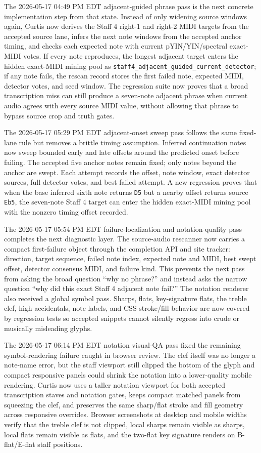 The 2026-05-17 04:49 PM EDT adjacent-guided phrase pass is the next concrete implementation step from that state. Instead of only widening source windows again, Curtis now derives the Staff 4 right-1 and right-2 MIDI targets from the accepted source lane, infers the next note windows from the accepted anchor timing, and checks each expected note with current pYIN/YIN/spectral exact-MIDI votes. If every note reproduces, the longest adjacent target enters the hidden exact-MIDI mining pool as \texttt{staff4\_adjacent\_guided\_current\_detector}; if any note fails, the rescan record stores the first failed note, expected MIDI, detector votes, and seed window. The regression suite now proves that a broad transcription miss can still produce a seven-note adjacent phrase when current audio agrees with every source MIDI value, without allowing that phrase to bypass source crop and truth gates.

The 2026-05-17 05:29 PM EDT adjacent-onset sweep pass follows the same fixed-lane rule but removes a brittle timing assumption. Inferred continuation notes now sweep bounded early and late offsets around the predicted onset before failing. The accepted five anchor notes remain fixed; only notes beyond the anchor are swept. Each attempt records the offset, note window, exact detector sources, full detector votes, and best failed attempt. A new regression proves that when the base inferred sixth note returns \texttt{D5} but a nearby offset returns source \texttt{Eb5}, the seven-note Staff 4 target can enter the hidden exact-MIDI mining pool with the nonzero timing offset recorded.

The 2026-05-17 05:54 PM EDT failure-localization and notation-quality pass completes the next diagnostic layer. The source-audio rescanner now carries a compact first-failure object through the completion API and site tracker: direction, target sequence, failed note index, expected note and MIDI, best swept offset, detector consensus MIDI, and failure kind. This prevents the next pass from asking the broad question ``why no phrase?'' and instead asks the narrow question ``why did this exact Staff 4 adjacent note fail?'' The notation renderer also received a global symbol pass. Sharps, flats, key-signature flats, the treble clef, high accidentals, note labels, and CSS stroke/fill behavior are now covered by regression tests so accepted snippets cannot silently regress into crude or musically misleading glyphs.

The 2026-05-17 06:14 PM EDT notation visual-QA pass fixed the remaining symbol-rendering failure caught in browser review. The clef itself was no longer a note-name error, but the staff viewport still clipped the bottom of the glyph and compact responsive panels could shrink the notation into a lower-quality mobile rendering. Curtis now uses a taller notation viewport for both accepted transcription staves and notation gates, keeps compact matched panels from squeezing the clef, and preserves the same sharp/flat stroke and fill geometry across responsive overrides. Browser screenshots at desktop and mobile widths verify that the treble clef is not clipped, local sharps remain visible as sharps, local flats remain visible as flats, and the two-flat key signature renders on B-flat/E-flat staff positions.

